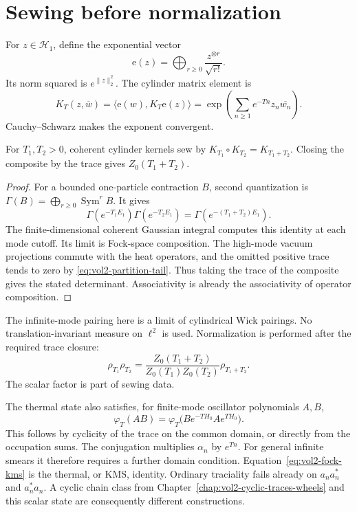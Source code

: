 \section{Sewing before normalization}

For \(z\in\mathcal H_1\), define the exponential vector
\[
 \mathrm e(z)=\bigoplus_{r\geq0}\frac{z^{\otimes r}}{\sqrt{r!}}.
\]
Its norm squared is \(e^{\|z\|_2^2}\). The cylinder matrix element is
\begin{equation}\label{eq:vol2-coherent-cylinder}
 K_T(z,\overline w)
 =\langle\mathrm e(w),K_T\mathrm e(z)\rangle
 =\exp\!\left(\sum_{n\geq1}e^{-Tn}z_n\overline{w_n}\right).
\end{equation}
Cauchy--Schwarz makes the exponent convergent.

\begin{proposition}\label{prop:vol2-fock-sewing}
For \(T_1,T_2>0\), coherent cylinder kernels sew by
\(K_{T_1}\circ K_{T_2}=K_{T_1+T_2}\). Closing the composite by
the trace gives \(Z_0(T_1+T_2)\).
\end{proposition}

\begin{proof}
For a bounded one-particle contraction \(B\), second quantization is
\(\Gamma(B)=\bigoplus_{r\geq0}\operatorname{Sym}^rB\). It gives
\[
 \Gamma(e^{-T_1E_1})\Gamma(e^{-T_2E_1})
 =\Gamma(e^{-(T_1+T_2)E_1}).
\]
The finite-dimensional coherent Gaussian integral computes this
identity at each mode cutoff. Its limit is Fock-space composition.
The high-mode vacuum projections commute with the heat operators,
and the omitted positive trace tends to zero by
\eqref{eq:vol2-partition-tail}. Thus taking the trace of the
composite gives the stated determinant. Associativity is already
the associativity of operator composition.
\end{proof}

The infinite-mode pairing here is a limit of cylindrical Wick
pairings. No translation-invariant measure on \(\ell^2\) is used.
Normalization is performed after the required trace closure:
\[
 \rho_{T_1}\rho_{T_2}
 =\frac{Z_0(T_1+T_2)}{Z_0(T_1)Z_0(T_2)}\rho_{T_1+T_2}.
\]
The scalar factor is part of sewing data.

The thermal state also satisfies, for finite-mode oscillator
polynomials \(A,B\),
\begin{equation}\label{eq:vol2-fock-kms}
 \varphi_T(AB)
 =\varphi_T\bigl(B e^{-TH_0}A e^{TH_0}\bigr).
\end{equation}
This follows by cyclicity of the trace on the common domain, or
directly from the occupation sums. The conjugation multiplies
\(\alpha_n\) by \(e^{Tn}\). For general infinite smears it
therefore requires a further domain condition.
Equation~\eqref{eq:vol2-fock-kms} is the thermal, or KMS, identity.
Ordinary traciality fails already on \(a_na_n^*\) and \(a_n^*a_n\).
A cyclic chain class from Chapter~\ref{chap:vol2-cyclic-traces-wheels}
and this scalar state are consequently different constructions.

